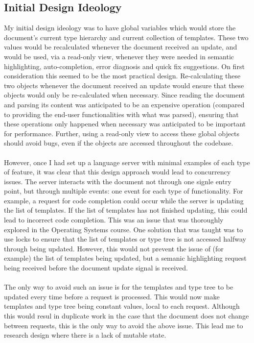 \documentclass[../main.tex]{subfiles}
\begin{document}
\subsection{Initial Design Ideology}
My initial design ideology was to have global variables which would store the document's current type hierarchy and current collection of templates. These two values would be recalculated whenever the document received an update, and would be used, via a read-only view, whenever they were needed in semantic highlighting, auto-completion, error diagnosis and quick fix suggestions. On first consideration this seemed to be the most practical design. Re-calculating these two objects whenever the document received an update would ensure that these objects would only be re-calculated when necessary. Since reading the document and parsing its content was anticipated to be an expensive operation (compared to providing the end-user functionalities with what was parsed), ensuring that these operations only happened when necessary was anticipated to be important for performance. Further, using a read-only view to access these global objects should avoid bugs, even if the objects are accessed throughout the codebase.
\\
\\
However, once I had set up a language server with minimal examples of each type of feature, it was clear that this design approach would lead to concurrency issues. The server interacts with the document not through one signle entry point, but through multiple events: one event for each type of functionality. For example, a request for code completion could occur while the server is updating the list of templates. If the list of templates has not finished updating, this could lead to incorrect code completion.
This was an issue that was thoroughly explored in the Operating Systems course. One solution that was taught was to use locks to ensure that the list of templates or type tree is not accessed halfway through being updated. However, this would not prevent the issue of (for example) the list of templates being updated, but a semanic highlighting request being received before the document update signal is received. 
\\
\\
The only way to avoid such an issue is for the templates and type tree to be updated every time before a request is processed. This would now make templates and type tree being constant values, local to each request. Although this would resul in duplicate work in the case that the document does not change between requests, this is the only way to avoid the above issue. This lead me to research design where there is a lack of mutable state.
\end{document}
